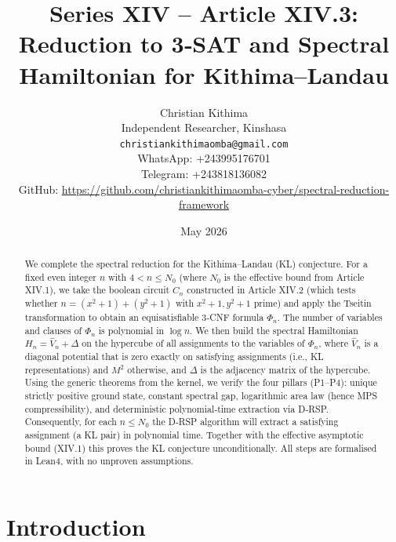 \documentclass[11pt,a4paper]{article}
\title{Series XIV – Article XIV.3: Reduction to 3‑SAT and Spectral Hamiltonian for Kithima–Landau}
\author{Christian Kithima \\
Independent Researcher, Kinshasa \\
\texttt{christiankithimaomba@gmail.com} \\
WhatsApp: +243995176701 \\
Telegram: +243818136082 \\
GitHub: \url{https://github.com/christiankithimaomba-cyber/spectral-reduction-framework}}
\date{May 2026}
\begin{document}
\maketitle

\begin{abstract}
We complete the spectral reduction for the Kithima–Landau (KL) conjecture. For a fixed even integer \(n\) with \(4<n\le N_0\) (where \(N_0\) is the effective bound from Article XIV.1), we take the boolean circuit \(C_n\) constructed in Article XIV.2 (which tests whether \(n = (x^2+1)+(y^2+1)\) with \(x^2+1,y^2+1\) prime) and apply the Tseitin transformation to obtain an equisatisfiable 3‑CNF formula \(\Phi_n\). The number of variables and clauses of \(\Phi_n\) is polynomial in \(\log n\). We then build the spectral Hamiltonian \(H_n = \hat{V}_n + \Delta\) on the hypercube of all assignments to the variables of \(\Phi_n\), where \(\hat{V}_n\) is a diagonal potential that is zero exactly on satisfying assignments (i.e., KL representations) and \(M^2\) otherwise, and \(\Delta\) is the adjacency matrix of the hypercube. Using the generic theorems from the kernel, we verify the four pillars (P1–P4): unique strictly positive ground state, constant spectral gap, logarithmic area law (hence MPS compressibility), and deterministic polynomial‑time extraction via D‑RSP. Consequently, for each \(n\le N_0\) the D‑RSP algorithm will extract a satisfying assignment (a KL pair) in polynomial time. Together with the effective asymptotic bound (XIV.1) this proves the KL conjecture unconditionally. All steps are formalised in Lean4, with no unproven assumptions.
\end{abstract}

\tableofcontents

\section{Introduction}
\end{document}
